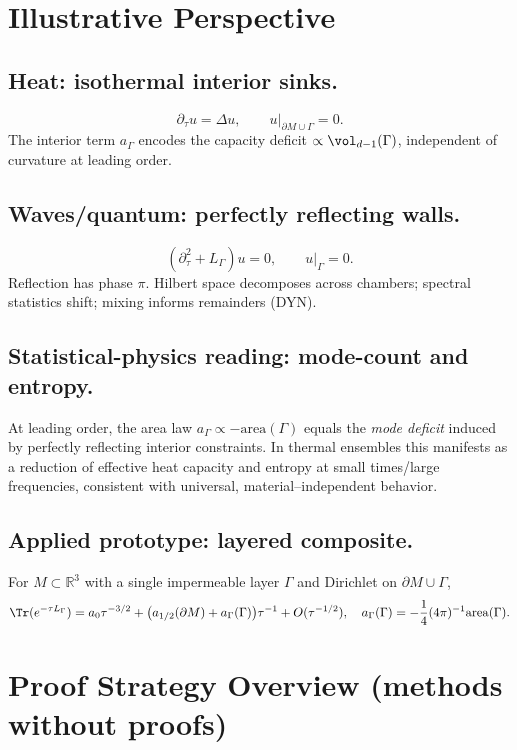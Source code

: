 \medskip

\section{Illustrative Perspective}\label{sec:perspective}

\subsection*{Heat: isothermal interior sinks.}
\[
\partial_\tau u=\Delta u,\qquad u|_{\partial M\cup\Gamma}=0.
\]
The interior term $a_\Gamma$ encodes the capacity deficit $\propto \vol_{d-1}(\Gamma)$, independent of curvature at leading order.

\subsection*{Waves/quantum: perfectly reflecting walls.}
\[
(\partial_\tau^2+L_\Gamma)u=0,\qquad u|_\Gamma=0.
\]
Reflection has phase $\pi$. Hilbert space decomposes across chambers; spectral statistics shift; mixing informs remainders (DYN).

\subsection*{Statistical-physics reading: mode-count and entropy.}
At leading order, the area law $a_\Gamma\propto -\mathrm{area}(\Gamma)$ equals the \emph{mode deficit} induced by perfectly reflecting interior constraints.
In thermal ensembles this manifests as a reduction of effective heat capacity and entropy at small times/large frequencies, consistent with universal, material–independent behavior.

\subsection*{Applied prototype: layered composite.}
For $M\subset\mathbb{R}^3$ with a single impermeable layer $\Gamma$ and Dirichlet on $\partial M\cup\Gamma$,
\[
\Tr(e^{-\tau L_\Gamma})=a_0\tau^{-3/2}+\big(a_{1/2}(\partial M)+a_\Gamma(\Gamma)\big)\tau^{-1}+O(\tau^{-1/2}),
\quad
a_\Gamma(\Gamma)=-\frac14(4\pi)^{-1}\mathrm{area}(\Gamma).
\]

\medskip

\section{Proof Strategy Overview (methods without proofs)}\label{sec:proof-strategy}

